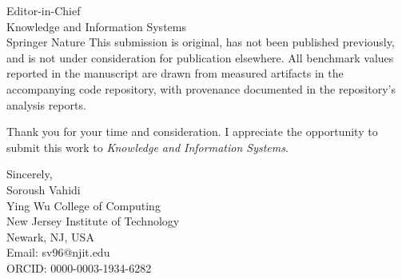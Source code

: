 \documentclass[12pt]{letter}
\begin{document}
\begin{letter}{Editor-in-Chief\\
Knowledge and Information Systems\\
Springer Nature}
This submission is original, has not been published previously, and is not under consideration for publication elsewhere. All benchmark values reported in the manuscript are drawn from measured artifacts in the accompanying code repository, with provenance documented in the repository's analysis reports.

Thank you for your time and consideration. I appreciate the opportunity to submit this work to \textit{Knowledge and Information Systems}.

\closing{Sincerely,\\[1em]
Soroush Vahidi\\
Ying Wu College of Computing\\
New Jersey Institute of Technology\\
Newark, NJ, USA\\
Email: sv96@njit.edu\\
ORCID: 0000-0003-1934-6282}

\end{letter}
\end{document}
